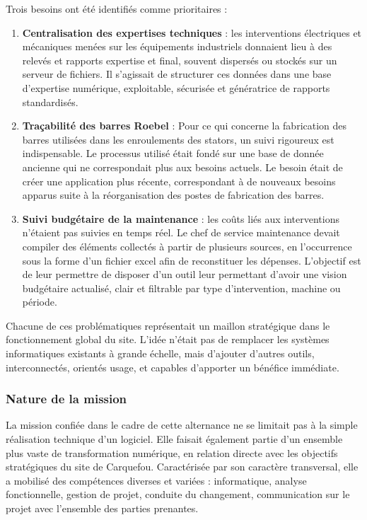 \documentclass[11pt,a4paper]{article}
\begin{document}
Trois besoins ont été identifiés comme prioritaires :

\begin{enumerate}
    \item \textbf{Centralisation des expertises techniques} : les interventions électriques et mécaniques menées sur les équipements industriels donnaient lieu à des relevés et rapports expertise et final, souvent dispersés ou stockés sur un serveur de fichiers. Il s’agissait de structurer ces données dans une base d’expertise numérique, exploitable, sécurisée et génératrice de rapports standardisés.

    \item \textbf{Traçabilité des barres Roebel} : Pour ce qui concerne la fabrication des barres utilisées dans les enroulements des stators, un suivi rigoureux est indispensable. Le processus utilisé était fondé sur une base de donnée ancienne qui ne correspondait plus aux besoins actuels. Le besoin était de créer une application plus récente, correspondant à de nouveaux besoins apparus suite à la réorganisation des postes de fabrication des barres. 

    \item \textbf{Suivi budgétaire de la maintenance} : les coûts liés aux interventions n’étaient pas suivies en temps réel. Le chef de service maintenance devait compiler des éléments collectés à partir de plusieurs sources, en l’occurrence sous la forme d’un fichier excel afin de reconstituer les dépenses. L’objectif est de leur permettre de disposer d’un outil leur permettant d’avoir une vision budgétaire actualisé, clair et filtrable par type d’intervention, machine ou période.
\end{enumerate}

Chacune de ces problématiques représentait un maillon stratégique dans le fonctionnement global du site. L’idée n’était pas de remplacer les systèmes informatiques existants à grande échelle, mais d'ajouter d'autres outils, interconnectés, orientés usage, et capables d’apporter un bénéfice immédiate.

\subsubsection{Nature de la mission}
La mission confiée dans le cadre de cette alternance ne se limitait pas à la simple réalisation technique d’un logiciel. Elle faisait également partie d’un ensemble plus vaste de transformation numérique, en relation directe avec les objectifs stratégiques du site de Carquefou. Caractérisée par son caractère transversal, elle a mobilisé des compétences diverses et variées : informatique, analyse fonctionnelle, gestion de projet, conduite du changement, communication sur le projet avec l’ensemble des parties prenantes.
\end{document}
